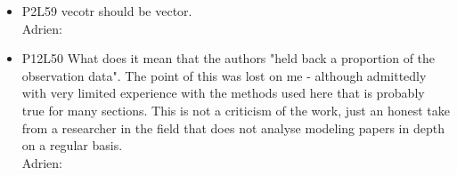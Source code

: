 \documentclass[12pt]{paper}
\begin{document}
{\begin{itemize}
{\color{red} We have amended the sentence in the introduction to read ''These sterile male mosquitoes are reproductively contained (but females that carry the sterilising construct are fertile) and could represent the first stage in a three-stage pathway to malaria vector control using a gene drive that results in a male-biased sex ratio''. We have also added additional text in the discussion (in conjunction with a response to reviewer 1) highlighting that the risk assessment, within which this analysis was conducted, also addressed the risks associated with the accidental release of fertile females.}
\item P2L59 vecotr should be vector.\\
{\color{red} Adrien:}
\item P12L50 What does it mean that the authors "held back a proportion of the observation data". The point of this was lost on me - although admittedly with very limited experience with the methods used here that is probably true for many sections. This is not a criticism of the work, just an honest take from a researcher in the field that does not analyse modeling papers in depth on a regular basis.\\
{\color{red} Adrien:}
\end{itemize} 
}
~\\
~\\
\end{document}
